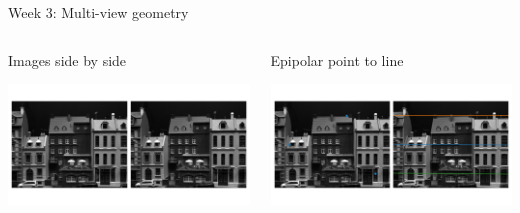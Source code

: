\documentclass[aspectratio=169,hyperref={pdfpagelabels=false}]{beamer}
\begin{document}
\begin{frame}{ Week 3: Multi-view geometry }
\begin{columns}
	\begin{column}{.5\textwidth}
		\begin{block}{Images side by side}
			\begin{center}
				\includegraphics[width=\textwidth]{exercise_imgs/ex3-8.png}
			\end{center}
		\end{block}					
	\end{column}	
	\begin{column}{.5\textwidth}
		\begin{block}{Epipolar point to line}
		\begin{center}
			\includegraphics[width=\textwidth]{exercise_imgs/ex3-9.png}
		\end{center}
		\end{block}					
	\end{column}	
\end{columns}	

\end{frame}
\end{document}
